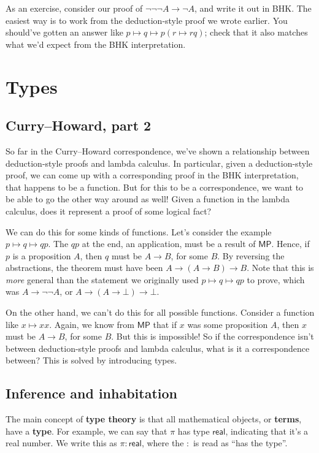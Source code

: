 \documentclass[11pt,paper=letter]{scrartcl}
\renewcommand{\sf}{\mathsf}
\renewcommand{\lnot}{\neg}
\newcommand{\false}{\bot}
\begin{document}
As an exercise, consider our proof of $\lnot\lnot\lnot A \to \lnot A$, and write it out in BHK. The easiest way is to work from the deduction-style proof we wrote earlier. You should've gotten an answer like $p \mapsto q \mapsto p(r \mapsto rq)$; check that it also matches what we'd expect from the BHK interpretation.

\clearpage

\section{Types}

\subsection{Curry--Howard, part 2}

So far in the Curry--Howard correspondence, we've shown a relationship between deduction-style proofs and lambda calculus. In particular, given a deduction-style proof, we can come up with a corresponding proof in the BHK interpretation, that happens to be a function. But for this to be a correspondence, we want to be able to go the other way around as well! Given a function in the lambda calculus, does it represent a proof of some logical fact?

We can do this for some kinds of functions. Let's consider the example $p \mapsto q \mapsto qp$. The $qp$ at the end, an application, must be a result of $\sf{MP}$. Hence, if $p$ is a proposition $A$, then $q$ must be $A \to B$, for some $B$. By reversing the abstractions, the theorem must have been $A \to (A \to B) \to B$. Note that this is \emph{more} general than the statement we originally used $p \mapsto q \mapsto qp$ to prove, which was $A \to \lnot\lnot A$, or $A \to (A \to \false) \to \false$.

On the other hand, we can't do this for all possible functions. Consider a function like $x \mapsto xx$. Again, we know from $\sf{MP}$ that if $x$ was some proposition $A$, then $x$ must be $A \to B$, for some $B$. But this is impossible! So if the correspondence isn't between deduction-style proofs and lambda calculus, what is it a correspondence between? This is solved by introducing types.

\subsection{Inference and inhabitation}

The main concept of \textbf{type theory} is that all mathematical objects, or \textbf{terms}, have a \textbf{type}. For example, we can say that $\pi$ has type $\sf{real}$, indicating that it's a real number. We write this as $\pi : \sf{real}$, where the $:$ is read as ``has the type''.
\end{document}
